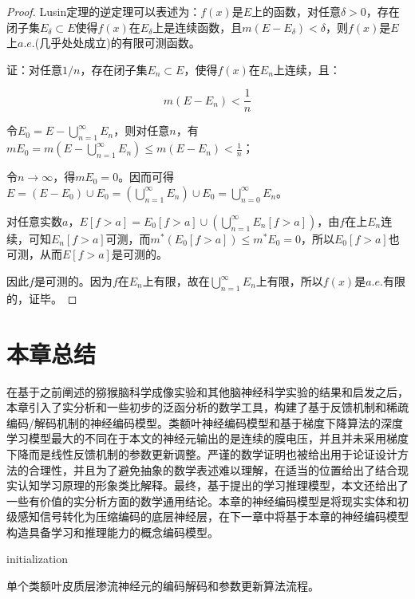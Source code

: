 \begin{proof}
Lusin定理的逆定理可以表述为：$f(x)$是$E$上的函数，对任意$\delta>0$，存在闭子集$E_{\delta} \subset E$使得$f(x)$在$E_{\delta}$上是连续函数，且$m(E-E_{\delta})<{\delta}$，则$f(x)$是$E$上$a.e.$(几乎处处成立)的有限可测函数。

证：对任意$1/n$，存在闭子集$E_{n} \subset E$，使得$f(x)$在$E_n$上连续，且：

$$m\left(E-E_{n}\right)<\frac{1}{n}$$

令$E_{0}=E-\bigcup_{n=1}^{\infty} E_{n}$，则对任意$n$，有$m E_{0}=m\left(E-\bigcup_{n=1}^{\infty} E_{n}\right) \le m\left(E-E_{n}\right)<\frac{1}{n}$；

令$n \rightarrow \infty$，得$m E_{0}=0$。因而可得$E=\left(E-E_{0}\right) \cup E_{0}=\left(\bigcup_{n=1}^{\infty} E_{n}\right) \cup E_{0}=\bigcup_{n=0}^{\infty} E_{n}$。

对任意实数$a$，$E[f>a]=E_{0}[f>a] \cup (\bigcup_{n=1}^{\infty} E_{n}[f>a])$，由$f$在上$E_n$连续，可知$E_{n}[f>a]$可测，而$m^{*}\left(E_{0}[f>a]\right) \leqslant m^{*} E_{0}=0$，所以$E_{0}[f>a]$也可测，从而$E[f>a]$是可测的。

因此$f$是可测的。因为$f$在$E_n$上有限，故在$\bigcup_{n=1}^{\infty} E_{n}$上有限，所以$f(x)$是$a.e.$有限的，证毕。
\end{proof}


\section{本章总结}
在基于之前阐述的猕猴脑科学成像实验和其他脑神经科学实验的结果和启发之后，本章引入了实分析和一些初步的泛函分析的数学工具，构建了基于反馈机制和稀疏编码/解码机制的神经编码模型。类额叶神经编码模型和基于梯度下降算法的深度学习模型最大的不同在于本文的神经元输出的是连续的膜电压，并且并未采用梯度下降而是线性反馈机制的参数更新调整。严谨的数学证明也被给出用于论证设计方法的合理性，并且为了避免抽象的数学表述难以理解，在适当的位置给出了结合现实认知学习原理的形象类比解释。最终，基于提出的学习推理模型，本文还给出了一些有价值的实分析方面的数学通用结论。本章的神经编码模型是将现实实体和初级感知信号转化为压缩编码的底层神经层，在下一章中将基于本章的神经编码模型构造具备学习和推理能力的概念编码模型。

\begin{algorithm}[htbp]
\SetAlgoLined
{}

initialization\;
\caption{单个类额叶皮质层渗流神经元的编码解码和参数更新算法流程。}
\label{algo:algo_41}
\end{algorithm}
